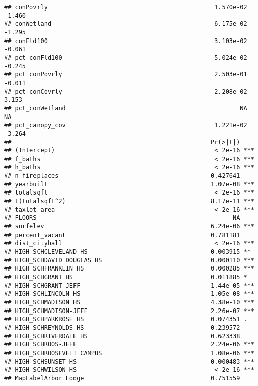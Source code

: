 \documentclass[]{article}
\begin{document}
\begin{verbatim}
## conPovrly                                              1.570e-02  -1.460
## conWetland                                             6.175e-02  -1.295
## conFld100                                              3.103e-02  -0.061
## pct_conFld100                                          5.024e-02  -0.245
## pct_conPovrly                                          2.503e-01  -0.011
## pct_conCovrly                                          2.208e-02   3.153
## pct_conWetland                                                NA      NA
## pct_canopy_cov                                         1.221e-02  -3.264
##                                                       Pr(>|t|)    
## (Intercept)                                            < 2e-16 ***
## f_baths                                                < 2e-16 ***
## h_baths                                                < 2e-16 ***
## n_fireplaces                                          0.427641    
## yearbuilt                                             1.07e-08 ***
## totalsqft                                              < 2e-16 ***
## I(totalsqft^2)                                        8.17e-11 ***
## taxlot_area                                            < 2e-16 ***
## FLOORS                                                      NA    
## surfelev                                              6.24e-06 ***
## percent_vacant                                        0.781181    
## dist_cityhall                                          < 2e-16 ***
## HIGH_SCHCLEVELAND HS                                  0.003915 ** 
## HIGH_SCHDAVID DOUGLAS HS                              0.000110 ***
## HIGH_SCHFRANKLIN HS                                   0.000285 ***
## HIGH_SCHGRANT HS                                      0.011885 *  
## HIGH_SCHGRANT-JEFF                                    1.44e-05 ***
## HIGH_SCHLINCOLN HS                                    1.05e-08 ***
## HIGH_SCHMADISON HS                                    4.38e-10 ***
## HIGH_SCHMADISON-JEFF                                  2.26e-07 ***
## HIGH_SCHPARKROSE HS                                   0.074351 .  
## HIGH_SCHREYNOLDS HS                                   0.239572    
## HIGH_SCHRIVERDALE HS                                  0.623338    
## HIGH_SCHROOS-JEFF                                     2.24e-06 ***
## HIGH_SCHROOSEVELT CAMPUS                              1.08e-06 ***
## HIGH_SCHSUNSET HS                                     0.000483 ***
## HIGH_SCHWILSON HS                                      < 2e-16 ***
## MapLabelArbor Lodge                                   0.751559    

\end{verbatim}
\end{document}
